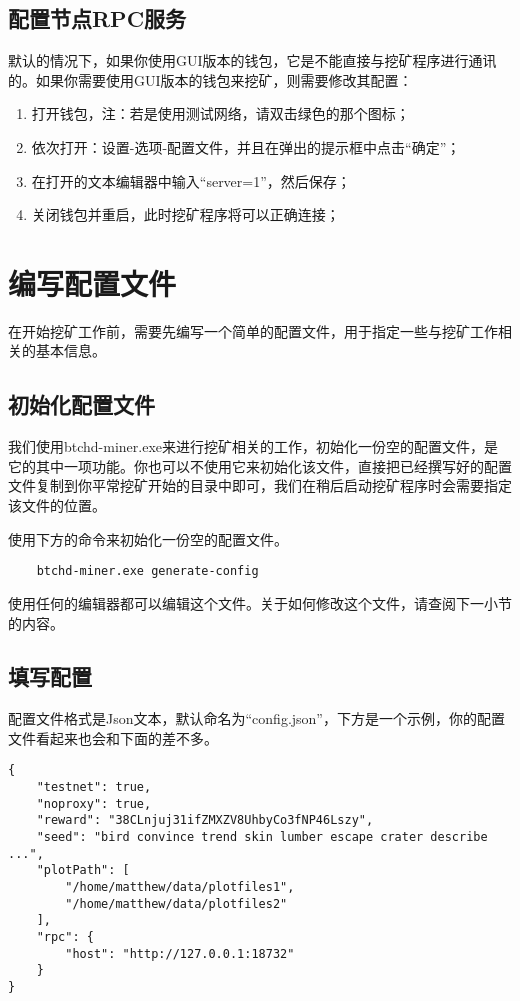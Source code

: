 \subsection{配置节点RPC服务}
\begin{flushleft}
    默认的情况下，如果你使用GUI版本的钱包，它是不能直接与挖矿程序进行通讯的。如果你需要使用GUI版本的钱包来挖矿，则需要修改其配置：
\end{flushleft}
\begin{enumerate}
    \item 打开钱包，注：若是使用测试网络，请双击绿色的那个图标；
    \item 依次打开：设置-选项-配置文件，并且在弹出的提示框中点击``确定''；
    \item 在打开的文本编辑器中输入``server=1''，然后保存；
    \item 关闭钱包并重启，此时挖矿程序将可以正确连接；
\end{enumerate}
\section{编写配置文件}
\begin{flushleft}
    在开始挖矿工作前，需要先编写一个简单的配置文件，用于指定一些与挖矿工作相关的基本信息。
\end{flushleft}
\subsection{初始化配置文件}
\begin{flushleft}
    我们使用btchd-miner.exe来进行挖矿相关的工作，初始化一份空的配置文件，是它的其中一项功能。你也可以不使用它来初始化该文件，直接把已经撰写好的配置文件复制到你平常挖矿开始的目录中即可，我们在稍后启动挖矿程序时会需要指定该文件的位置。
\end{flushleft}
\begin{flushleft}
    使用下方的命令来初始化一份空的配置文件。
\end{flushleft}
\scriptsize
\begin{verbatim}
    btchd-miner.exe generate-config
\end{verbatim}
\normalsize
\begin{flushleft}
    使用任何的编辑器都可以编辑这个文件。关于如何修改这个文件，请查阅下一小节的内容。
\end{flushleft}
\subsection{填写配置}
\begin{flushleft}
    配置文件格式是Json文本，默认命名为``config.json''，下方是一个示例，你的配置文件看起来也会和下面的差不多。
\end{flushleft}
\scriptsize
\begin{verbatim}
{
    "testnet": true,
    "noproxy": true,
    "reward": "38CLnjuj31ifZMXZV8UhbyCo3fNP46Lszy",
    "seed": "bird convince trend skin lumber escape crater describe ...",
    "plotPath": [
        "/home/matthew/data/plotfiles1",
        "/home/matthew/data/plotfiles2"
    ],
    "rpc": {
        "host": "http://127.0.0.1:18732"
    }
}
\end{verbatim}
\normalsize
